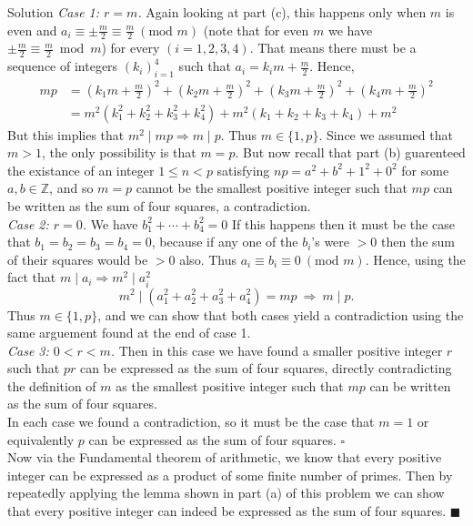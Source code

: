 \documentclass{article}
\begin{document}
\begin{solution}{Solution}
\textit{Case 1: $r = m$.} Again looking at part (c), this happens only when
$m$ is even and $a_i \equiv \pm \frac{m}{2} \equiv \frac{m}{2}
\ (\text{mod } m)$
(note that for even $m$ we have
$\pm \frac{m}{2} \equiv \frac{m}{2} \bmod m$) for every $(i=1,2,3,4)$. That
means there must be a sequence of integers $(k_i)_{i=1}^4$ such that
$a_i = k_i m + \frac{m}{2}$. Hence,
\[
\begin{aligned}
mp &= \left(k_1 m + \frac{m}{2}\right)^2 +
      \left(k_2 m + \frac{m}{2}\right)^2 +
      \left(k_3 m + \frac{m}{2}\right)^2 +
      \left(k_4 m + \frac{m}{2}\right)^2\\
&= m^2 (k_1^2 + k_2^2 + k_3^2 + k_4^2) + m^2 (k_1 + k_2 + k_3 + k_4) + m^2
\end{aligned}
\]
But this implies that $m^2 \mid mp \Rightarrow m \mid p$. Thus
$m \in \{1,p\}$. Since we assumed that $m > 1$, the only possibility is that
$m = p$. But now recall that part (b) guarenteed the existance of an
integer $1 \leq n < p$ satisfying $np = a^2 + b^2 + 1^2 + 0^2$ for some
$a,b\in \mathbb{Z}$, and so $m = p$ cannot be the smallest positive integer
such that $mp$ can be written as the sum of four squares, a contradiction.
\\

\textit{Case 2: $r=0$.} We have
$b_1^2 + \cdots + b_4^2 = 0$ If this happens then it must be the case that
$b_1 = b_2 = b_3 = b_4 = 0$, because if any one of the $b_i$'s
were $ > 0$ then the sum of their squares would be $ > 0$ also. Thus
$a_i \equiv b_i \equiv 0 \ (\text{mod } m)$. Hence, using the fact that
$m \mid a_i \Rightarrow m^2 \mid a_i^2$
$$
m^2 \mid (a_1^2 + a_2^2 + a_3^2 + a_4^2) = mp \ \Rightarrow \ m \mid p.
$$
Thus $m \in \{1,p\}$, and we can show that both cases yield a contradiction
using the same arguement found at the end of case 1.
\\

\textit{Case 3: $0 < r < m$.} Then in this case we have found a smaller
positive integer $r$ such that $pr$ can be expressed as the sum of four
squares, directly contradicting the definition of $m$ as the smallest
positive integer such that $mp$ can be written as the sum of four squares.
\\

In each case we found a contradiction, so it must be the case that $m=1$
or equivalently $p$ can be expressed as the sum of four squares. $\square$
\\

Now via the Fundamental theorem of arithmetic, we know that every positive
integer can be expressed as a product of some finite number of primes.
Then by repeatedly applying the lemma shown in part (a) of this problem
we can show that every positive integer can indeed be expressed as the
sum of four squares. $\blacksquare$
\end{solution}
\end{document}
